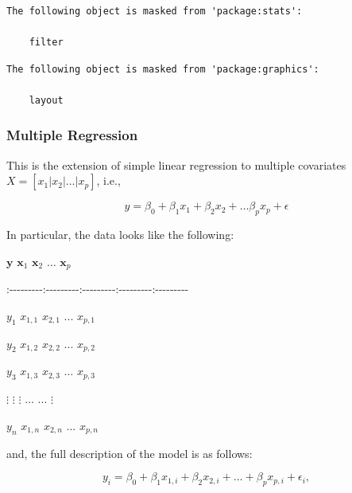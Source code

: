 \documentclass[
  letterpaper,
  DIV=11,
  numbers=noendperiod]{scrartcl}
\begin{document}
\begin{verbatim}
The following object is masked from 'package:stats':

    filter
\end{verbatim}

\begin{verbatim}
The following object is masked from 'package:graphics':

    layout
\end{verbatim}

\hypertarget{multiple-regression}{%
\subsubsection{Multiple Regression}\label{multiple-regression}}

This is the extension of simple linear regression to multiple covariates
\(X = [x_1 | x_2 | \dots |x_p]\), i.e.,

\[
y = \beta_0 + \beta_1 x_1 + \beta_2 x_2 + \dots \beta_p x_p + \epsilon
\]

In particular, the data looks like the following:

\textbar{} \(\mathbf y\) \textbar{} \(\mathbf x_1\) \textbar{}
\(\mathbf x_2\) \textbar{} \(\dots\) \textbar{} \(\mathbf x_p\)
\textbar{}

\textbar:-\/-\/-\/-\/-\/-\/-\/-\/-\textbar:-\/-\/-\/-\/-\/-\/-\/-\/-\textbar:-\/-\/-\/-\/-\/-\/-\/-\/-\textbar:-\/-\/-\/-\/-\/-\/-\/-\/-\textbar:-\/-\/-\/-\/-\/-\/-\/-\/-\textbar{}

\textbar{}\(y_{1}\) \textbar{}\(x_{1,1}\) \textbar{}\(x_{2,1}\)
\textbar{}\({...}\) \textbar{}\(x_{p,1}\) \textbar{}

\textbar{}\(y_{2}\) \textbar{}\(x_{1,2}\) \textbar{}\(x_{2,2}\)
\textbar{}\({...}\) \textbar{}\(x_{p,2}\) \textbar{}

\textbar{}\(y_{3}\) \textbar{}\(x_{1,3}\) \textbar{}\(x_{2,3}\)
\textbar{}\({…}\) \textbar{}\(x_{p,3}\) \textbar{}

\textbar{}\({\vdots}\) \textbar{}\({\vdots}\) \textbar{}\({\vdots}\)
\textbar{}\(\dots\) \textbar{}\(\dots\) \textbar{}\(\vdots\)

\textbar{}\(y_{n}\) \textbar{}\(x_{1,n}\) \textbar{}\(x_{2,n}\)
\textbar{}\({...}\) \textbar{}\(x_{p,n}\) \textbar{}

and, the full description of the model is as follows:

\[
y_i = \beta_0 + \beta_1 x_{1,i} + \beta_2 x_{2, i} + \dots + \beta_p x_{p,i} + \epsilon_i,
\]
\end{document}
